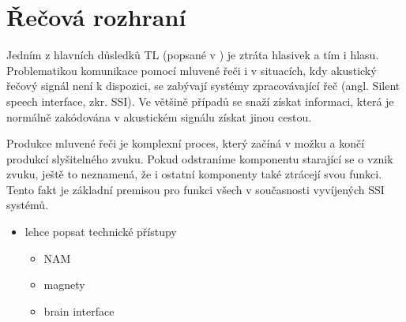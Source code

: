 \chapter{Řečová rozhraní}

Jedním z hlavních důsledků TL (popsané v ) je ztráta hlasivek a tím i hlasu. Problematikou komunikace pomocí mluvené řeči i v situacích, kdy akustický řečový signál není k dispozici, se zabývají  systémy zpracovávající  řeč (angl. Silent speech interface, zkr. SSI). Ve většině případů se snaží získat informaci, která je normálně zakódována v akustickém signálu získat jinou cestou.

Produkce mluvené řeči je komplexní proces, který začíná v možku a končí produkcí slyšitelného zvuku. Pokud odstraníme komponentu starající se o vznik zvuku, ještě to neznamená, že i ostatní komponenty také ztrácejí svou funkci. Tento fakt je základní premisou pro funkci všech v současnosti vyvíjených SSI systémů.


\begin{itemize}
  \item lehce popsat technické přístupy
  \begin{itemize}
    \item NAM
    \item magnety
    \item brain interface
  \end{itemize}
\end{itemize}
